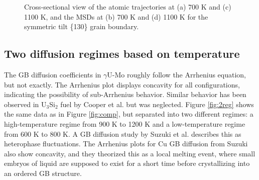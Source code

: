 \documentclass{elsarticle}
\providecommand{\DIFadd}[1]{{\protect\color{blue} \sf #1}} %
\providecommand{\DIFdel}[1]{}
\providecommand{\DIFaddbegin}{} %
\providecommand{\DIFaddend}{} %
\providecommand{\DIFdelbegin}{} %
\providecommand{\DIFdelend}{} %
\providecommand{\DIFaddFL}[1]{\DIFadd{#1}} %
\providecommand{\DIFdelFL}[1]{\DIFdel{#1}} %
\providecommand{\DIFaddbeginFL}{} %
\providecommand{\DIFaddendFL}{} %
\providecommand{\DIFdelbeginFL}{} %
\providecommand{\DIFdelendFL}{} %
\begin{document}
\begin{figure}[!ht]
\begin{subfigure}{0.49\textwidth}
	\end{subfigure}
\caption{\DIFdelbeginFL \DIFdelFL{Atomic trajectory lines in }\DIFdelendFL \DIFaddbeginFL \DIFaddFL{Cross-sectional view of }\DIFaddendFL the \DIFdelbeginFL \DIFdelFL{GB cross sections }\DIFdelendFL \DIFaddbeginFL \DIFaddFL{atomic trajectories }\DIFaddendFL at (a) 700 K and (c) 1100 K, and the \DIFdelbeginFL \DIFdelFL{MSD }\DIFdelendFL \DIFaddbeginFL \DIFaddFL{MSDs }\DIFaddendFL at (b) 700 K and (d) 1100 K for the symmetric tilt \{130\} grain boundary.}
\label{fig:130}
\end{figure}


\FloatBarrier
\subsection{Two diffusion regimes based on temperature}

The \DIFdelbegin \DIFdel{diffusion coefficients of }\DIFdelend \DIFaddbegin \DIFadd{GB diffusion coefficients in }\DIFaddend $\gamma$U-Mo roughly follow the Arrhenius equation, but not exactly. The Arrhenius plot displays concavity for all configurations, indicating the possibility of sub-Arrhenius behavior. Similar behavior has been observed in U$_3$Si$_2$ fuel by Cooper et al. \cite{cooper2021} \DIFdelbegin \DIFdel{, }\DIFdelend but was neglected. Figure \ref{fig:2reg} shows the same data as in Figure \ref{fig:comp}, but separated into two different regimes: a high-temperature regime from 900 K to 1200 K and a low-temperature regime from 600 K to 800 K. A GB diffusion study by Suzuki et al. \cite{suzuki2005} describes this as heterophase fluctuations. The Arrhenius plots for Cu GB diffusion from Suzuki also show concavity, and they theorized this as a local melting event, where small embryos of liquid are supposed to exist for a short time before crystallizing into an ordered GB structure.
\end{document}
